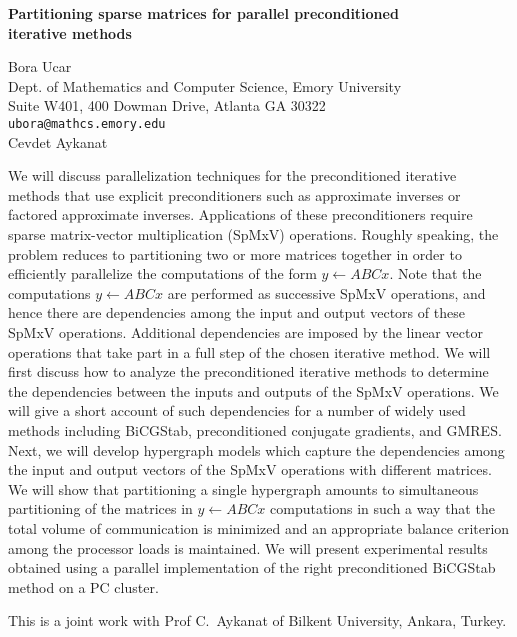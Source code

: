 \documentclass[twosided]{report}
\begin{document}
\begin{center}
{\large			%
{\bf Partitioning sparse matrices for parallel preconditioned \\
	iterative methods}}

	Bora Ucar \\
	Dept. of Mathematics and Computer Science, Emory University \\
	Suite W401, 400 Dowman Drive, Atlanta GA 30322 \\
	{\tt ubora@mathcs.emory.edu} \\
	Cevdet Aykanat
\end{center}
We will discuss parallelization techniques for the
preconditioned iterative methods that use explicit
preconditioners such as approximate inverses or factored
approximate inverses. Applications of these preconditioners
require sparse matrix-vector multiplication (SpMxV)
operations. Roughly speaking, the problem reduces to
partitioning two or more matrices together in order to
efficiently parallelize the computations of the form $y\gets
ABCx$. Note that the computations $y\gets ABCx$ are
performed as successive SpMxV operations, and hence there
are dependencies among the input and output vectors of these
SpMxV operations. Additional dependencies are imposed by the
linear vector operations that take part in a full step of
the chosen iterative method. We will first discuss how to
analyze the preconditioned iterative methods to determine
the dependencies between the inputs and outputs of the SpMxV
operations. We will give a short account of such
dependencies for a number of widely used methods including
BiCGStab, preconditioned conjugate gradients, and GMRES.
Next, we will develop hypergraph models which capture the
dependencies among the input and output vectors of the SpMxV
operations with different matrices. We will show that
partitioning a single hypergraph amounts to simultaneous
partitioning of the matrices in $y\gets ABCx$ computations
in such a way that the total volume of communication is
minimized and an appropriate balance criterion among the
processor loads is maintained. We will present experimental
results obtained using a parallel implementation of the
right preconditioned BiCGStab method on a PC cluster.

This is a joint work with Prof C.~Aykanat of Bilkent
University, Ankara, Turkey.
\end{document}
